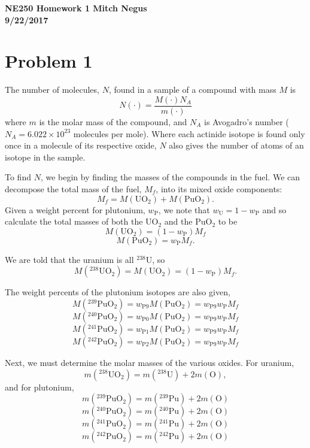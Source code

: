 \documentclass{article}
\begin{document}
\thispagestyle{empty}

{\bf {\large {NE250 Homework {1} \hfill Mitch Negus\\
		\hspace*{\fill} 9/22/2017\\ }}}
		

\section*{Problem 1}

The number of molecules, $N$, found in a sample of a compound with mass $M$ is 
$$ N(\cdot) = \frac{M(\cdot) N_A}{m(\cdot)} $$
where $m$ is the molar mass of the compound, and $N_A$ is Avogadro's number ($N_A = 6.022 \times 10^{23}$ molecules per mole). Where each actinide isotope is found only once in a molecule of its respective oxide, $N$ also gives the number of atoms of an isotope in the sample. 

To find $N$, we begin by finding the masses of the compounds in the fuel. We can decompose the total mass of the fuel, $M_f$, into its mixed oxide components:
$$ M_f = M(\text{UO}_2) + M(\text{PuO}_2). $$
Given a weight percent for plutonium, $w_{\text{P}}$, we note that $w_{\text{U}} = 1-w_{\text{P}}$ and so calculate the total masses of both the UO$_2$ and the PuO$_2$ to be
$$ M(\text{UO}_2) = (1-w_{\text{P}})M_f	$$
$$ M(\text{PuO}_2) = w_{\text{P}}M_f. $$

We are told that the uranium is all $^{238}$U, so 
$$ M(^{238}\text{UO}_2) = M(\text{UO}_2) = (1-w_{\text{P}})M_f. $$

The weight percents of the plutonium isotopes are also given,
$$ M(^{239}\text{PuO}_2) = w_{\text{P}9}M(\text{PuO}_2) = w_{\text{P}9}w_{\text{P}}M_f $$
$$ M(^{240}\text{PuO}_2) = w_{\text{P}0}M(\text{PuO}_2) = w_{\text{P}9}w_{\text{P}}M_f $$
$$ M(^{241}\text{PuO}_2) = w_{\text{P}1}M(\text{PuO}_2) = w_{\text{P}9}w_{\text{P}}M_f $$
$$ M(^{242}\text{PuO}_2) = w_{\text{P}2}M(\text{PuO}_2) = w_{\text{P}9}w_{\text{P}}M_f $$

Next, we must determine the molar masses of the various oxides. For uranium,
$$ m(^{238}\text{UO}_2) = m(^{238}\text{U}) + 2m(\text{O}), $$
and for plutonium,
$$ m(^{239}\text{PuO}_2) = m(^{239}\text{Pu}) + 2m(\text{O}) $$
$$ m(^{240}\text{PuO}_2) = m(^{240}\text{Pu}) + 2m(\text{O}) $$
$$ m(^{241}\text{PuO}_2) = m(^{241}\text{Pu}) + 2m(\text{O}) $$
$$ m(^{242}\text{PuO}_2) = m(^{242}\text{Pu}) + 2m(\text{O}) $$
\end{document}
